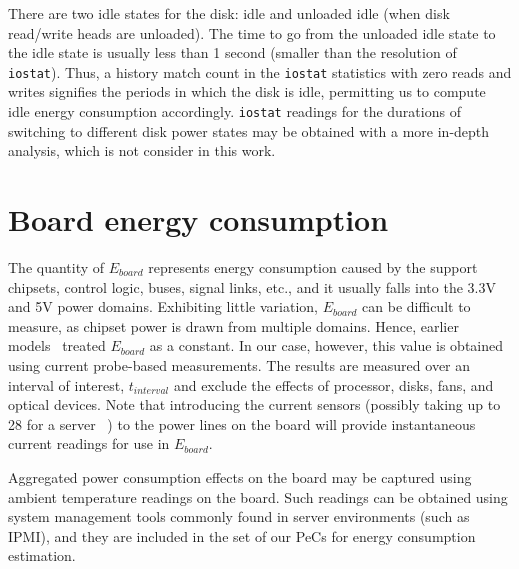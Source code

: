 There are two idle states for the disk: idle and unloaded idle (when
disk read/write heads are unloaded).  The time to go from the unloaded
idle state to the idle state is usually less than 1 second (smaller than
the resolution of \texttt{iostat}).  Thus, a history match count in the
\texttt{iostat} statistics with zero reads and writes signifies the
periods in which the disk is idle, permitting us to compute idle energy
consumption accordingly.  \texttt{iostat} readings for the durations of
switching to different disk power states may be obtained with a more
in-depth analysis, which is not consider in this work.

\section{Board energy consumption}
\label{sec:board}
The quantity of $E_{board}$ represents energy consumption caused by the
support chipsets, control logic, buses, signal links, etc., and it
usually falls into the 3.3V and 5V power domains.  Exhibiting little
variation, $E_{board}$ can be difficult to measure, as chipset power is
drawn from multiple domains.  Hence, earlier
models~\cite{Kansal2010,Bircher2011} treated $E_{board}$ as a
constant. In our case, however, this value is obtained using current
probe-based measurements.  The results are measured over an interval of
interest, $t_{interval}$ and exclude the effects of processor, disks,
fans, and optical devices.  Note that introducing the current sensors
(possibly taking up to 28 for a server ~\cite{SSI2004}) to the power
lines on the board will provide instantaneous current readings for use
in $E_{board}$.

Aggregated power consumption effects on the board may be captured using
ambient temperature readings on the board.  Such readings can be
obtained using system management tools commonly found in server
environments (such as IPMI), and they are included in the set of our PeCs
for energy consumption estimation.


